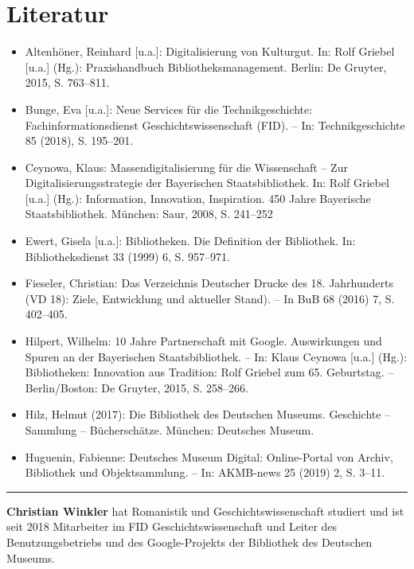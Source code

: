\documentclass[a4paper,
fontsize=11pt,
oneside,
numbers=noperiodatend,
parskip=half-,
bibliography=totoc,
final
]{scrartcl}
\begin{document}
\hypertarget{literatur}{%
\section{Literatur}\label{literatur}}

\begin{itemize}
\item
  Altenhöner, Reinhard {[}u.a.{]}: Digitalisierung von Kulturgut. In:
   Rolf Griebel {[}u.a.{]} (Hg.): Praxishandbuch
  Bibliotheksmanagement.  Berlin: De Gruyter, 2015, S.
  763--811.
\item
  Bunge, Eva {[}u.a.{]}: Neue Services für die Technikgeschichte:
   Fachinformationsdienst Geschichtswissenschaft (FID). --
  In:  Technikgeschichte 85 (2018), S. 195--201.
\item
  Ceynowa, Klaus: Massendigitalisierung für die Wissenschaft -- Zur
   Digitalisierungsstrategie der Bayerischen
  Staatsbibliothek. In:  Rolf Griebel {[}u.a.{]} (Hg.):
  Information, Innovation, Inspiration.  450 Jahre
  Bayerische Staatsbibliothek. München: Saur, 2008, S. 
  241--252
\item
  Ewert, Gisela {[}u.a.{]}: Bibliotheken. Die Definition der Bibliothek.
   In: Bibliotheksdienst 33 (1999) 6, S. 957--971.
\item
  Fieseler, Christian: Das Verzeichnis Deutscher Drucke des 18.
   Jahrhunderts (VD 18): Ziele, Entwicklung und aktueller
  Stand). --  In BuB 68 (2016) 7, S. 402--405.
\item
  Hilpert, Wilhelm: 10 Jahre Partnerschaft mit Google. Auswirkungen
   und Spuren an der Bayerischen Staatsbibliothek. -- In:
  Klaus  Ceynowa {[}u.a.{]} (Hg.): Bibliotheken:
  Innovation aus Tradition:  Rolf Griebel zum 65.
  Geburtstag. -- Berlin/Boston: De Gruyter,  2015, S.
  258--266.
\item
  Hilz, Helmut (2017): Die Bibliothek des Deutschen Museums.
   Geschichte -- Sammlung -- Bücherschätze. München:
  Deutsches  Museum.
\item
  Huguenin, Fabienne: Deutsches Museum Digital: Online-Portal von
   Archiv, Bibliothek und Objektsammlung. -- In: AKMB-news
  25 (2019)  2, S. 3--11.
\end{itemize}

\begin{center}\rule{0.5\linewidth}{0.5pt}\end{center}

\textbf{Christian Winkler} hat Romanistik und Geschichtswissenschaft
studiert und ist seit 2018 Mitarbeiter im FID Geschichtswissenschaft und
Leiter des Benutzungsbetriebs und des Google-Projekts der Bibliothek des
Deutschen Museums.
\end{document}

